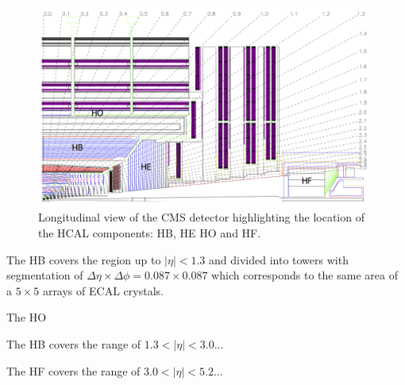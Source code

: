 \begin{figure}[!htb]
  \centering
  \includegraphics[width=1.0\textwidth]{Chapter02/CMS/Images/CMS_HCAL_Layout.png}
  \caption{Longitudinal view of the CMS detector highlighting the location of the \gls{HCAL} components: \gls{HB}, \gls{HE} \gls{HO} and \gls{HF}.}
  \label{FIGURE:ExperimentalApparatus_CMS_HCAL_Layout}
\end{figure}

The \gls{HB} covers the region up to $|\eta|<1.3$ and divided into towers with segmentation of $\Delta\eta \times \Delta\phi = 0.087 \times 0.087$ which corresponds to the same area of a $5 \times 5$ arrays of \gls{ECAL} crystals. 


The \gls{HO}


The \gls{HB} covers the range of $1.3<|\eta|<3.0$...


The \gls{HF} covers the range of $3.0<|\eta|<5.2$...


